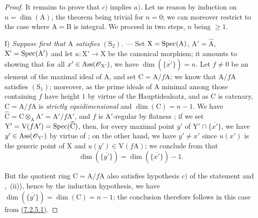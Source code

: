 \begin{proof}

It remains to prove that $c)$ implies $a)$.
Let us reason by induction on $n=\dim(\mathrm{A})$, the theorem being trivial for $n=0$; we can moreover restrict to the case where $\mathrm{A}=\mathrm{B}$ is integral.
We proceed in two steps, $n$ being $\geqslant 1$.

\medskip\noindent
I) \emph{Suppose first that $\mathrm{A}$ satisfies $(\mathrm{S}_2)$.} ---
Set $\mathrm{X}=\operatorname{Spec}(\mathrm{A})$, $\mathrm{A}'=\widehat{\mathrm{A}}$, $\mathrm{X}'=\operatorname{Spec}(\mathrm{A}')$ and let $u:\mathrm{X}'\to\mathrm{X}$ be the canonical morphism; it amounts to showing that for all $x'\in\operatorname{Ass}(\mathscr{O}_{\mathrm{X}'})$, we have $\dim(\overline{\{x'\}})=n$.
Let $f\neq 0$ be an element of the maximal ideal of $\mathrm{A}$, and set $\mathrm{C}=\mathrm{A}/f\mathrm{A}$; we know  that $\mathrm{A}/f\mathrm{A}$ satisfies $(\mathrm{S}_1)$; moreover, as the prime ideals of $\mathrm{A}$ minimal among those containing $f$ have height $1$ by virtue of the Hauptidealsatz, and as $\mathrm{C}$ is catenary, $\mathrm{C}=\mathrm{A}/f\mathrm{A}$ is \emph{strictly equidimensional} and $\dim(\mathrm{C})=n-1$.
We have $\widehat{\mathrm{C}}=\mathrm{C}\otimes_\mathrm{A}\mathrm{A}'=\mathrm{A}'/f\mathrm{A}'$, and $f$ is $\mathrm{A}'$-regular by flatness ; if we set $\mathrm{Y}'=\mathrm{V}(f\mathrm{A}')=\operatorname{Spec}(\widehat{\mathrm{C}})$, then, for every maximal point $y'$ of $\mathrm{Y}'\cap\overline{\{x'\}}$, we have $y'\in\operatorname{Ass}(\mathscr{O}_{\mathrm{Y}'})$ by virtue of ; on the other hand, we have $y'\neq x'$ since $u(x')$ is the generic point of $\mathrm{X}$  and $u(y')\in\mathrm{V}(f\mathrm{A})$; we conclude from  that
\[
  \dim(\overline{\{y'\}})=\dim(\overline{\{x'\}})-1.
  \tag{7.2.5.1}
\label{IV.7.2.5.1}
\]

But the quotient ring $\mathrm{C}=\mathrm{A}/f\mathrm{A}$ also satisfies hypothesis $c)$ of the statement  and ,~(ii)), hence by the induction hypothesis, we have $\dim(\overline{\{y'\}})=\dim(\mathrm{C})=n-1$; the conclusion therefore follows in this case from {\hyperref[IV.7.2.5.1]{(7.2.5.1)}}.


\end{proof}
